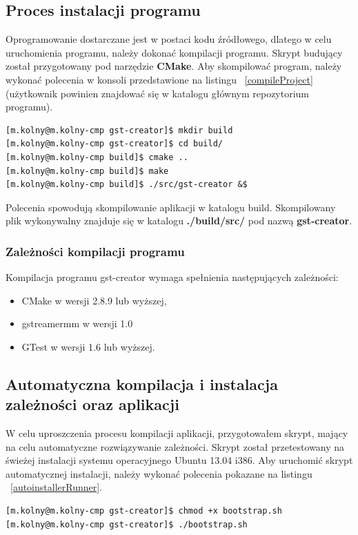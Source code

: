 \documentclass[12pt]{article}
\begin{document}
\subsection{Proces instalacji programu}
Oprogramowanie dostarczane jest w postaci kodu źródłowego, dlatego w celu uruchomienia programu, należy dokonać kompilacji programu. Skrypt budujący został przygotowany pod narzędzie \textbf{CMake}. Aby skompilować program, należy wykonać polecenia w konsoli przedstawione na listingu ~\ref{compileProject} (użytkownik powinien znajdować się w katalogu głównym repozytorium programu).
\begin{lstlisting}[caption=Polecenia kompilujące program gst-creator, label=compileProject]
[m.kolny@m.kolny-cmp gst-creator]$ mkdir build
[m.kolny@m.kolny-cmp gst-creator]$ cd build/
[m.kolny@m.kolny-cmp build]$ cmake ..
[m.kolny@m.kolny-cmp build]$ make
[m.kolny@m.kolny-cmp build]$ ./src/gst-creator &$
\end{lstlisting}
Polecenia spowodują skompilowanie aplikacji w katalogu build. Skompilowany plik wykonywalny znajduje się w katalogu \textbf{./build/src/} pod nazwą \textbf{gst-creator}. 
\subsubsection{Zależności kompilacji programu}
Kompilacja programu gst-creator wymaga spełnienia następujących zależności:
\begin{itemize}
  \setlength{\itemsep}{0em}
\item CMake w wersji 2.8.9 lub wyższej,
\item gstreamermm w wersji 1.0
\item GTest w wersji 1.6 lub wyższej.
\end{itemize}
\subsection{Automatyczna kompilacja i instalacja zależności oraz aplikacji}
W celu uproszczenia procesu kompilacji aplikacji, przygotowałem skrypt, mający na celu automatyczne rozwiązywanie zależności. Skrypt został przetestowany na świeżej instalacji systemu operacyjnego Ubuntu 13.04 i386. Aby uruchomić skrypt automatycznej instalacji, należy wykonać polecenia pokazane na listingu ~\ref{autoinstallerRunner}.
\begin{lstlisting}[caption=Uruchomienie skryptu autoinstalatora, label=autoinstallerRunner]
[m.kolny@m.kolny-cmp gst-creator]$ chmod +x bootstrap.sh
[m.kolny@m.kolny-cmp gst-creator]$ ./bootstrap.sh
\end{lstlisting}
\end{document}

